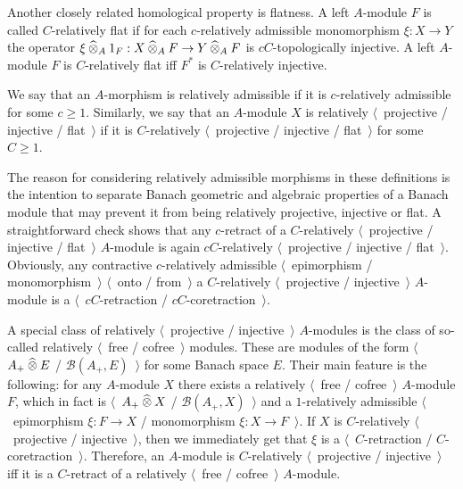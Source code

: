Another closely related homological property is flatness. A
left $A$-module $F$ is called $C$-relatively flat if for each
$c$-relatively admissible monomorphism $\xi:X\to Y$ the operator 
$\xi\mathbin{\widehat{\otimes}}_{A} 1_F:X\mathbin{\widehat{\otimes}}_{A} F\to Y\mathbin{\widehat{\otimes}}_{A} F$ is
$cC$-topologically injective. A left $A$-module $F$ is $C$-relatively flat iff
$F^*$ is $C$-relatively injective. 

We say that an $A$-morphism is relatively admissible if it is $c$-relatively 
admissible for some $c\geq 1$. Similarly, we say that an $A$-module $X$ is 
relatively $\langle$~projective / injective / flat~$\rangle$ if it is  
$C$-relatively $\langle$~projective / injective / flat~$\rangle$ for 
some $C\geq 1$.

The reason for considering relatively admissible morphisms in these definitions
is the intention to separate Banach geometric and algebraic properties of a 
Banach module that may prevent it from being relatively projective, injective or flat. 
A straightforward check shows that any $c$-retract of a 
$C$-relatively $\langle$~projective / injective / flat~$\rangle$ $A$-module is 
again $cC$-relatively $\langle$~projective / injective / flat~$\rangle$. 
Obviously, any contractive $c$-relatively admissible $\langle$~epimorphism
/ monomorphism~$\rangle$ $\langle$~onto / from~$\rangle$ a $C$-relatively
$\langle$~projective / injective~$\rangle$ $A$-module is a 
$\langle$~$cC$-retraction / $cC$-coretraction~$\rangle$.

A special class of relatively $\langle$~projective / injective~$\rangle$
$A$-modules is the class of so-called 
relatively $\langle$~free / cofree~$\rangle$ modules. 
These are modules of the form $\langle$~$A_+\mathbin{\widehat{\otimes}} E$ /
$\mathcal{B}(A_+,E)$~$\rangle$ for some Banach space $E$. Their main feature is
the following: for any $A$-module $X$ there exists a relatively $\langle$~free /
cofree~$\rangle$ $A$-module $F$, which in fact is $\langle$~$A_+\mathbin{\widehat{\otimes}} X$ /
$\mathcal{B}(A_+,X)$~$\rangle$ and a $1$-relatively admissible 
$\langle$~epimorphism $\xi:F\to X$ / monomorphism $\xi:X\to F$~$\rangle$. 
If $X$ is $C$-relatively
$\langle$~projective / injective~$\rangle$, then we immediately get that $\xi$ is a
$\langle$~$C$-retraction / $C$-coretraction~$\rangle$. Therefore, an $A$-module 
is $C$-relatively $\langle$~projective / injective~$\rangle$ iff it is 
a $C$-retract of a relatively $\langle$~free / cofree~$\rangle$ $A$-module. 


